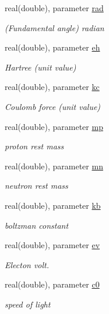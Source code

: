 \begin{DoxyCompactItemize}
real(double), parameter \hyperlink{classatomicunits_a07ac069b1a5417fd61aa3954d6b66d83}{rad}
\begin{DoxyCompactList}\small\item\em (Fundamental angle) radian \end{DoxyCompactList}\item 
real(double), parameter \hyperlink{classatomicunits_a39b85d20ed96ab0b9dfb86c7646a61a0}{eh}
\begin{DoxyCompactList}\small\item\em Hartree (unit value) \end{DoxyCompactList}\item 
real(double), parameter \hyperlink{classatomicunits_aafc175708d34f52459448530cdec9aae}{kc}
\begin{DoxyCompactList}\small\item\em Coulomb force (unit value) \end{DoxyCompactList}\item 
real(double), parameter \hyperlink{classatomicunits_a62f37608529c74a442a81baa515965d6}{mp}
\begin{DoxyCompactList}\small\item\em proton rest mass \end{DoxyCompactList}\item 
real(double), parameter \hyperlink{classatomicunits_a001e0a01ab152644eb7df31ade44b290}{mn}
\begin{DoxyCompactList}\small\item\em neutron rest mass \end{DoxyCompactList}\item 
real(double), parameter \hyperlink{classatomicunits_afe876defe82137d91908691c6765a5f1}{kb}
\begin{DoxyCompactList}\small\item\em boltzman constant \end{DoxyCompactList}\item 
real(double), parameter \hyperlink{classatomicunits_a10a69964ce0d082d71ee5ae34a5a0d24}{ev}
\begin{DoxyCompactList}\small\item\em Electon volt. \end{DoxyCompactList}\item 
real(double), parameter \hyperlink{classatomicunits_ae35b35bfa15b571da842371a32dcb2e6}{c0}
\begin{DoxyCompactList}\small\item\em speed of light \end{DoxyCompactList}\item 

\end{DoxyCompactItemize}
